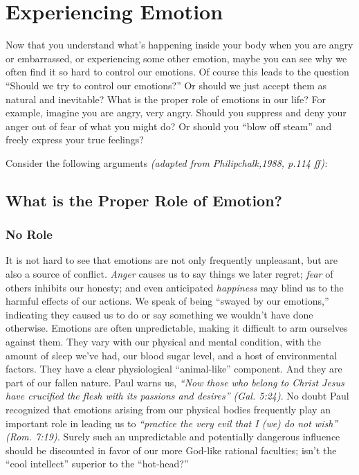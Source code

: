 \documentclass[
]{book}
\begin{document}
\hypertarget{experiencing-emotion}{%
\section{Experiencing Emotion}\label{experiencing-emotion}}

Now that you understand what's happening inside your body when you are angry or embarrassed, or experiencing some other emotion, maybe you can see why we often find it so hard to control our emotions. Of course this leads to the question ``Should we try to control our emotions?'' Or should we just accept them as natural and inevitable? What is the proper role of emotions in our life? For example, imagine you are angry, very angry. Should you suppress and deny your anger out of fear of what you might do? Or should you ``blow off steam'' and freely express your true feelings?

Consider the following arguments \emph{(adapted from Philipchalk,1988, p.114 ff):}

\hypertarget{what-is-the-proper-role-of-emotion}{%
\subsection*{What is the Proper Role of Emotion?}\label{what-is-the-proper-role-of-emotion}}

\hypertarget{no-role}{%
\subsubsection*{No Role}\label{no-role}}

It is not hard to see that emotions are not only frequently unpleasant, but are also a source of conflict. \emph{Anger} causes us to say things we later regret; \emph{fear} of others inhibits our honesty; and even anticipated \emph{happiness} may blind us to the harmful effects of our actions. We speak of being ``swayed by our emotions,'' indicating they caused us to do or say something we wouldn't have done otherwise. Emotions are often unpredictable, making it difficult to arm ourselves against them. They vary with our physical and mental condition, with the amount of sleep we've had, our blood sugar level, and a host of environmental factors. They have a clear physiological ``animal-like'' component. And they are part of our fallen nature. Paul warns us, \emph{``Now those who belong to Christ Jesus have crucified the flesh with its passions and desires'' (Gal. 5:24)}. No doubt Paul recognized that emotions arising from our physical bodies frequently play an important role in leading us to \emph{``practice the very evil that I (we) do not wish'' (Rom. 7:19).} Surely such an unpredictable and potentially dangerous influence should be discounted in favor of our more God-like rational faculties; isn't the ``cool intellect'' superior to the ``hot-head?''
\end{document}
